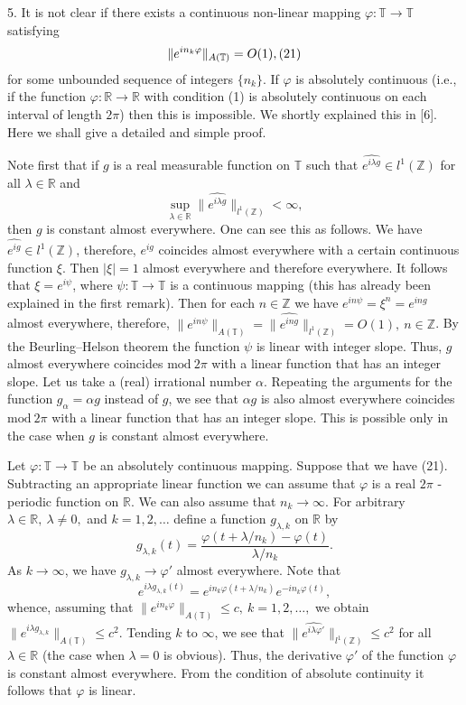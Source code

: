 \documentclass[12pt]{article}
\begin{document}
  5. It is not clear if there exists a continuous non-linear
mapping $\varphi : \mathbb T\rightarrow\mathbb T$ satisfying
$$
\|e^{in_k\varphi}\|_{A(\mathbb T)}=O(1),
\relax(21)
$$
for some unbounded sequence of integers $\{n_k\}$. If $\varphi$ is
absolutely continuous (i.e., if the function $\varphi: \mathbb
R\rightarrow\mathbb R$ with condition (1) is absolutely continuous
on each interval of length  $2\pi$) then this is impossible. We
shortly explained this in [6]. Here we shall give a detailed and
simple proof.

   Note first that if $g$ is a real measurable function on
$\mathbb T$ such that $\widehat{e^{i\lambda g}}\in l^1(\mathbb Z)$
for all $\lambda\in\mathbb R$ and
$$
\sup_{\lambda\in\mathbb R}
\|\widehat{e^{i\lambda g}}\|_{l^1(\mathbb Z)}<\infty,
$$
then $g$ is constant almost everywhere. One can see this as
follows. We have $\widehat{e^{ig}}\in l^1(\mathbb Z)$, therefore,
$e^{ig}$ coincides almost everywhere with a certain continuous
function $\xi$. Then $|\xi|=1$ almost everywhere and therefore
everywhere. It follows that $\xi=e^{i\psi}$, where $\psi : \mathbb
T\rightarrow\mathbb T$ is a continuous mapping (this has already
been explained in the first remark). Then for each $n\in\mathbb Z$
we have $e^{in\psi}=\xi^n=e^{ing}$ almost everywhere, therefore,
$\|e^{in\psi}\|_{A(\mathbb T)}=\|\widehat{e^{ing}}\|_{l^1(\mathbb
Z)}=O(1), ~n\in\mathbb Z$. By the Beurling--Helson theorem the
function $\psi$ is linear with integer slope. Thus, $g$ almost
everywhere coincides $\mathrm{mod}~2\pi$ with a linear function
that has an integer slope. Let us take a (real) irrational number
$\alpha$. Repeating the arguments for the function
$g_\alpha=\alpha g$ instead of $g$, we see that $\alpha g$ is also
almost everywhere coincides $\mathrm{mod}~2\pi$ with a linear
function that has an integer slope. This is possible only in the
case when $g$ is constant almost everywhere.

  Let $\varphi : \mathbb T\rightarrow\mathbb T$ be an absolutely
continuous mapping. Suppose that we have (21). Subtracting an
appropriate linear function we can assume that $\varphi$ is a real
$2\pi$ -periodic function on $\mathbb R$. We can also assume that
$n_k\rightarrow\infty$. For arbitrary $\lambda\in\mathbb R,
~\lambda\neq 0,$ and $k=1, 2, \ldots$ define a function
$g_{\lambda, k}$ on $\mathbb R$ by
$$
g_{\lambda, k}(t)=
\frac{\varphi(t+\lambda/n_k)-\varphi(t)}{\lambda/n_k}.
$$
As $k\rightarrow\infty$, we have $g_{\lambda, k}\rightarrow
\varphi'$ almost everywhere. Note that
$$
e^{i\lambda g_{\lambda, k}(t)}=
e^{in_k\varphi(t+\lambda/n_k)}e^{-in_k\varphi(t)},
$$
whence, assuming that $\|e^{in_k\varphi}\|_{A(\mathbb T)}\leq c,
~k=1, 2, \ldots,$ we obtain $\|e^{i\lambda g_{\lambda,
k}}\|_{A(\mathbb T)}\leq c^2$. Tending $k$ to $\infty$, we see
that $\|\widehat{e^{i\lambda\varphi'}}\|_{l^1(\mathbb Z)}\leq c^2$
for all $\lambda\in\mathbb R$ (the case when $\lambda=0$ is
obvious). Thus, the derivative $\varphi'$ of the function
$\varphi$ is constant almost everywhere. From the condition of
absolute continuity it follows that $\varphi$ is linear.
\end{document}
